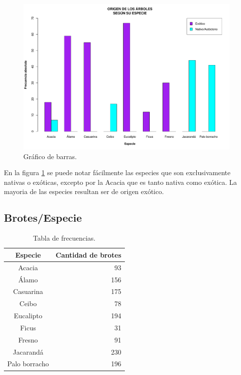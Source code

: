 \documentclass[11pt]{article}
\begin{document}
\begin{figure}[h!]
  \begin{center}
    \includegraphics[width=0.9\linewidth]{barrasOrigenEspecie.pdf}
    \caption{Gráfico de barras.}
    \label{fig:barrasOrigenEspecie}
  \end{center}  
\end{figure}

\begin{justify}
  En la figura \ref{fig:barrasOrigenEspecie} se puede notar fácilmente
  las especies que son exclusivamente nativas o exóticas, excepto por la Acacia
  que es tanto nativa como exótica. La mayoria de las especies resultan ser
  de origen exótico.
\end{justify}


\newpage
\subsection{Brotes/Especie}

\begin{table}[h!]
  \begin{center}
    \begin{tabular}{| c | r |}
      \hline
      \textbf{Especie} & \textbf{Cantidad de brotes} \\ \hline
      Acacia & 93 \\ \hline
      Álamo & 156 \\ \hline
      Casuarina & 175 \\ \hline
      Ceibo & 78 \\ \hline
      Eucalipto & 194 \\ \hline
      Ficus & 31 \\ \hline
      Fresno & 91 \\ \hline
      Jacarandá & 230 \\ \hline
      Palo borracho & 196 \\ \hline
    \end{tabular}
  \caption{Tabla de frecuencias.}
  \label{tab:tablaBrotesEspecie}
  \end{center}
\end{table}
\end{document}
